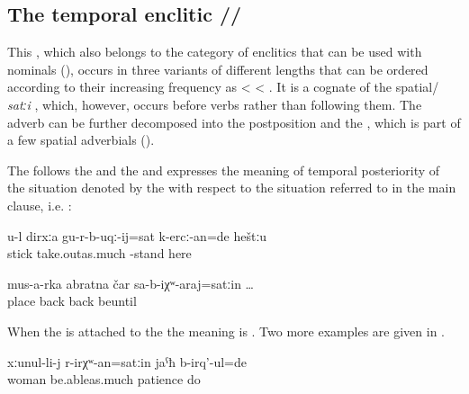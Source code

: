 
\subsection{The temporal enclitic \slash{}\slash{} }
\label{sec:enclitic =satin}

This , which also belongs to the category of enclitics that can be used with nominals (), occurs in three variants of different lengths that can be ordered according to their increasing frequency as   <  < . It is a cognate of the spatial/ \textit{satːi} , which, however, occurs before verbs rather than following them. The adverb can be further decomposed into the postposition   and the  , which is part of a few spatial adverbials ().

The  follows the  and the  and expresses the meaning of temporal posteriority of the situation denoted by the  with respect to the situation referred to in the main clause, i.e. :
%
\begin{exe}
	\ex	\label{ex:Until you take your stick out, you have to stand there}
	\gll	u-l	dirxːa	gu-r-b-uqː-ij=sat	k-ercː-an=de	heštːu\\
			stick	take.outas.much -stand	here\\
	\glt	{}

	\ex	\label{ex:Before (the turtle) came back from that place}
	\gll	mus-a-rka	abratna	čar	sa-b-iχʷ-araj=satːin	\ldots\\
		place		back	back	beuntil\\
	\glt	{}
\end{exe}

When the  is attached to the  the meaning is  . Two more examples are given in .
%
\begin{exe}
	\ex	\label{ex:‎‎‎The woman was patient as long as she could}
	\gll	xːunul-li-j	r-irχʷ-an=satːin	jaˁħ	b-irq'-ul=de\\
		woman	be.ableas.much	patience	do\\
	\glt	{}
\end{exe}

